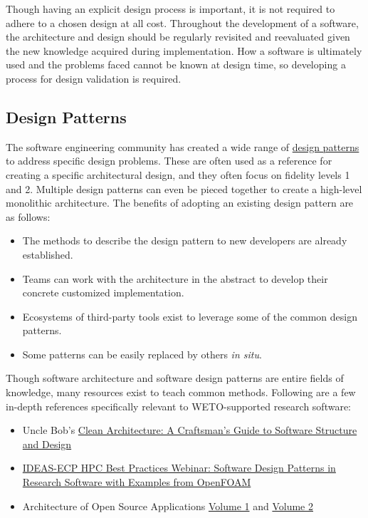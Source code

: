 \documentclass[]{nrel}
\begin{document}
Though having an explicit design process is important, it is not required to adhere to a chosen
design at all cost.
Throughout the development of a software, the architecture and design should be regularly
revisited and reevaluated given the new knowledge acquired during implementation.
How a software is ultimately used and the problems faced cannot be known at design time,
so developing a process for design validation is required.

\subsection{Design Patterns}
The software engineering community has created a wide range of
\href{https://en.wikipedia.org/wiki/Software_design_pattern#Classification_and_list}{design patterns}
to address specific design problems.
These are often used as a reference for creating a specific architectural design,
and they often focus on fidelity levels 1 and 2.
Multiple design patterns can even be pieced together to create a high-level monolithic architecture.
The benefits of adopting an existing design pattern are as follows:
\begin{itemize}
    
    \item The methods to describe the design pattern to new developers are already established.
    \item Teams can work with the architecture in the abstract to develop their concrete customized
        implementation.
    \item Ecosystems of third-party tools exist to leverage some of the common design patterns.
    \item Some patterns can be easily replaced by others \textit{in situ}.
\end{itemize}

Though software architecture and software design patterns are entire fields of knowledge,
many resources exist to teach common methods.
Following are a few in-depth references specifically relevant to WETO-supported research software:
\begin{itemize}    
\item Uncle Bob's \href{https://books.google.com/books/about/Clean_Architecture.html?id=uGE1DwAAQBAJ&source=kp_book_description}{Clean Architecture: A Craftsman's Guide to Software Structure and Design}
\item \href{https://www.youtube.com/watch?v=UWmkj-9SdAI}{IDEAS-ECP HPC Best Practices Webinar: Software Design Patterns in Research Software with Examples from OpenFOAM}
\item Architecture of Open Source Applications \href{https://aosabook.org/en/#aosa1}{Volume 1} and \href{https://aosabook.org/en/#aosa2}{Volume 2}
\end{itemize}
\end{document}
